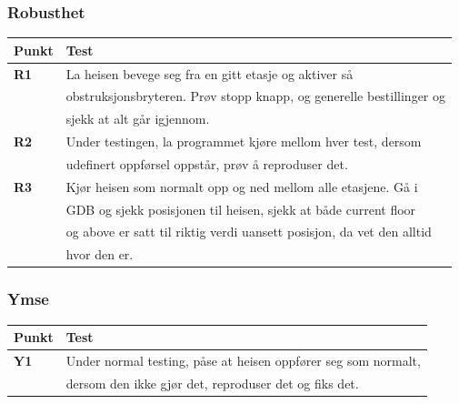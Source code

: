 \documentclass{article}
\begin{document}
\subsubsection{Robusthet}
\begin{table}[htbp]
\begin{tabularx}{\textwidth}{ l l }  %
\toprule
Punkt & Test \\
        \midrule
        \textbf{R1} & La heisen bevege seg fra en gitt etasje og aktiver så \\
        & obstruksjonsbryteren. Prøv stopp knapp, og generelle bestillinger og \\
        & sjekk at alt går igjennom. \\
        \midrule
        \textbf{R2} & Under testingen, la programmet kjøre mellom hver test, dersom \\
        & udefinert oppførsel oppstår, prøv å reproduser det. \\
        \midrule
        \textbf{R3} & Kjør heisen som normalt opp og ned mellom alle etasjene. Gå i \\
        & GDB og sjekk posisjonen til heisen, sjekk at både current floor \\
        & og above er satt til riktig verdi uansett posisjon, da vet den alltid \\
        & hvor den er. \\
\bottomrule
\end{tabularx}
\label{table:nonlin}
\end{table}
\newpage
\subsubsection{Ymse}
\begin{table}[htbp]
\begin{tabularx}{\textwidth}{ l l }  %
\toprule
Punkt & Test \\
        \midrule
        \textbf{Y1} & Under normal testing, påse at heisen oppfører seg som normalt,\\
        & dersom den ikke gjør det, reproduser det og fiks det. \\
\bottomrule
\end{tabularx}
\label{table:nonlin}
\end{table}
\end{document}
